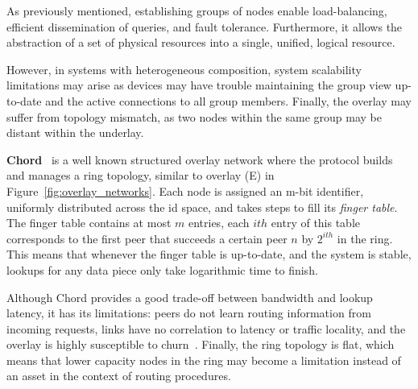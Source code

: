 As previously mentioned, establishing groups of nodes enable load-balancing, efficient dissemination of queries, and fault tolerance. Furthermore, it allows the abstraction of a set of physical resources into a single, unified, logical resource. 

However, in systems with heterogeneous composition, system scalability limitations may arise as devices may have trouble maintaining the group view up-to-date and the active connections to all group members. Finally, the overlay may suffer from topology mismatch, as two nodes within the same group may be distant within the underlay.

\textbf{Chord}~\cite{stoica2003chord} is a well known structured overlay network where the protocol builds and manages a ring topology, similar to overlay (E) in Figure~\ref{fig:overlay_networks}. Each node is assigned an m-bit identifier, uniformly distributed across the id space, and takes steps to fill its \textit{finger table}. The finger table contains at most \(m\) entries, each $ith$ entry of this table corresponds to the first peer that succeeds a certain peer \(n\) by \(2^{ith}\) in the ring. This means that whenever the finger table is up-to-date, and the system is stable, lookups for any data piece only take logarithmic time to finish. 

Although Chord provides a good trade-off between bandwidth and lookup latency, it has its limitations: peers do not learn routing information from incoming requests, links have no correlation to latency or traffic locality, and the overlay is highly susceptible to churn~\cite{dht_performance_churn}. Finally, the ring topology is flat, which means that lower capacity nodes in the ring may become a limitation instead of an asset in the context of routing procedures.




